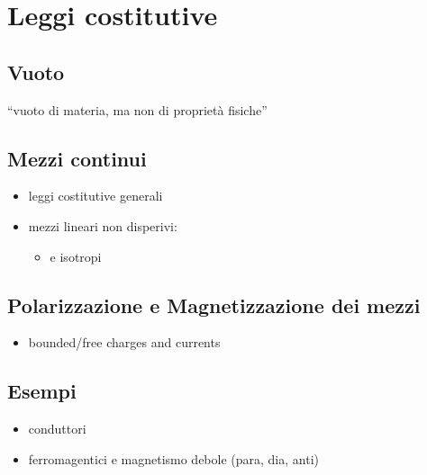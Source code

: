 \documentclass[letterpaper,10pt,english]{jupyterBook}
\begin{document}
\chapter{Leggi costitutive}
\label{\detokenize{ch/media:leggi-costitutive}}\label{\detokenize{ch/media:classical-electromagnetism-media}}\label{\detokenize{ch/media::doc}}
\sphinxAtStartPar
{}


\section{Vuoto}
\label{\detokenize{ch/media:vuoto}}
\sphinxAtStartPar
“vuoto di materia, ma non di proprietà fisiche”


\section{Mezzi continui}
\label{\detokenize{ch/media:mezzi-continui}}\begin{itemize}
\item {} 
\sphinxAtStartPar
leggi costitutive generali

\item {} 
\sphinxAtStartPar
mezzi lineari non disperivi:
\begin{itemize}
\item {} 
\sphinxAtStartPar
e isotropi

\end{itemize}

\end{itemize}


\section{Polarizzazione e Magnetizzazione dei mezzi}
\label{\detokenize{ch/media:polarizzazione-e-magnetizzazione-dei-mezzi}}\begin{itemize}
\item {} 
\sphinxAtStartPar
bounded/free charges and currents

\end{itemize}


\section{Esempi}
\label{\detokenize{ch/media:esempi}}\begin{itemize}
\item {} 
\sphinxAtStartPar
conduttori

\item {} 
\sphinxAtStartPar
ferromagentici e magnetismo debole (para\sphinxhyphen{}, dia\sphinxhyphen{}, anti\sphinxhyphen{})

\end{itemize}
\end{document}
